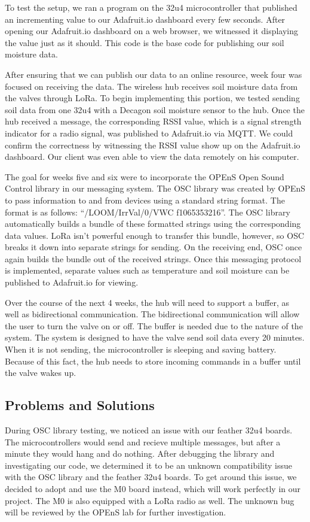 \documentclass[onecolumn, draftclsnofoot,10pt, compsoc]{IEEEtran}
\begin{document}
    
	To test the setup, we ran a program on the 32u4 microcontroller that published an incrementing value to our Adafruit.io dashboard every few seconds. 
    After opening our Adafruit.io dashboard on a web browser, we witnessed it displaying the value just as it should. 
    This code is the base code for publishing our soil moisture data. 
    
    
	After ensuring that we can publish our data to an online resource,  week four was focused on receiving the data. 
    The wireless hub receives soil moisture data from the valves through LoRa. 
    To begin implementing this portion, we tested sending soil data from one 32u4 with a Decagon soil moisture sensor to the hub. 
    Once the hub received a message, the corresponding RSSI value, which is a signal strength indicator for a radio signal, was published to Adafruit.io via MQTT. 
    We could confirm the correctness by witnessing the RSSI value show up on the Adafruit.io dashboard.
    Our client was even able to view the data remotely on his computer. 
    
    
	The goal for weeks five and six were to incorporate the OPEnS Open Sound Control library in our messaging system. 
    The OSC library was created by OPEnS to pass information to and from devices using a standard string format.
    The format is as follows: “/LOOM/IrrVal/0/VWC f1065353216”. 
    The OSC library automatically builds a bundle of these formatted strings using the corresponding data values.
    LoRa isn’t powerful enough to transfer this bundle, however, so OSC breaks it down into separate strings for sending. 
    On the receiving end, OSC once again builds the bundle out of the received strings. 
    Once this messaging protocol is implemented, separate values such as temperature and soil moisture can be published to Adafruit.io for viewing. 
    
    
    Over the course of the next 4 weeks, the hub will need to support a buffer, as well as bidirectional communication. 
    The bidirectional communication will allow the user to turn the valve on or off. 
    The buffer is needed due to the nature of the system. 
    The system is designed to have the valve send soil data every 20 minutes. 
    When it is not sending, the microcontroller is sleeping and saving battery.
    Because of this fact, the hub needs to store incoming commands in a buffer until the valve wakes up. 
    \subsection{Problems and Solutions}
	During OSC library testing, we noticed an issue with our feather 32u4 boards.
    The microcontrollers would send and recieve multiple messages, but after a minute they would hang and do nothing. 
    After debugging the library and investigating our code, we determined it to be an unknown compatibility issue with the OSC library and the feather 32u4 boards. 
    To get around this issue, we decided to adopt and use the M0 board instead, which will work perfectly in our project. 
    The M0 is also equipped with a LoRa radio as well. 
    The unknown bug will be reviewed by the OPEnS lab for further investigation.
    
\end{document}
